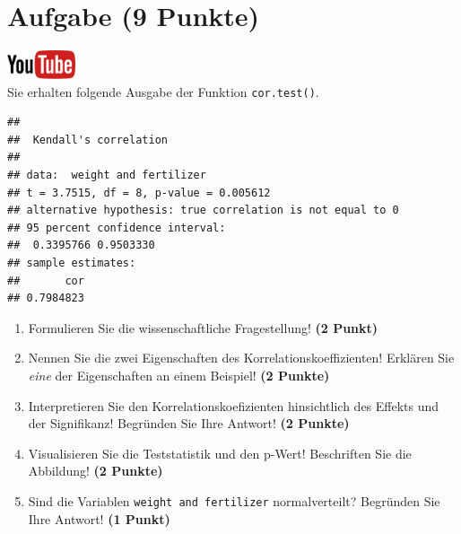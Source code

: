 \documentclass[a4paper, 9pt]{scrartcl}\usepackage[]{graphicx}\usepackage[]{xcolor}
\makeatletter
\newenvironment{kframe}{%
 \def\at@end@of@kframe{}%
 \ifinner\ifhmode%
  \def\at@end@of@kframe{\end{minipage}}%
  \begin{minipage}{\columnwidth}%
 \fi\fi%
 \def\FrameCommand##1{\hskip\@totalleftmargin \hskip-\fboxsep
 \colorbox{shadecolor}{##1}\hskip-\fboxsep
     \hskip-\linewidth \hskip-\@totalleftmargin \hskip\columnwidth}%
 \MakeFramed {\advance\hsize-\width
   \@totalleftmargin\z@ \linewidth\hsize
   \@setminipage}}%
 {\par\unskip\endMakeFramed%
 \at@end@of@kframe}
\newenvironment{knitrout}{}{} %
\makeatother
\begin{document}
 
\clearpage

\section{Aufgabe \hfill (9 Punkte)}

\hfill\href{https://youtu.be/C9skfFRTHhI}{\includegraphics[width =
   2cm]{img/youtube}}\\[1Ex]

Sie erhalten folgende \Rlogo Ausgabe der Funktion \texttt{cor.test()}.

\begin{knitrout}
\color{fgcolor}\begin{kframe}
\begin{verbatim}
## 
## 	Kendall's correlation
## 
## data:  weight and fertilizer
## t = 3.7515, df = 8, p-value = 0.005612
## alternative hypothesis: true correlation is not equal to 0
## 95 percent confidence interval:
##  0.3395766 0.9503330
## sample estimates:
##       cor 
## 0.7984823
\end{verbatim}
\end{kframe}
\end{knitrout}


\begin{enumerate}
  \item Formulieren Sie die wissenschaftliche Fragestellung! \textbf{(2
Punkt)}
\item Nennen Sie die zwei Eigenschaften des Korrelationskoeffizienten!
  Erkl{\"a}ren Sie \textit{eine} der Eigenschaften an einem Beispiel! \textbf{(2
    Punkte)}
\item Interpretieren Sie den Korrelationskoefizienten hinsichtlich des
  Effekts und der Signifikanz! Begr{\"u}nden Sie
  Ihre Antwort! \textbf{(2 Punkte)}
\item Visualisieren Sie die Teststatistik und den p-Wert! Beschriften Sie die Abbildung! \textbf{(2 Punkte)} 
\item Sind die Variablen \texttt{weight and fertilizer} normalverteilt?
  Begr{\"u}nden Sie Ihre Antwort! \textbf{(1 Punkt)}
\end{enumerate} 
\clearpage
\end{document}

